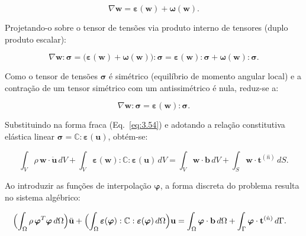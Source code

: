 \begin{equation}
    \nabla\mathbf{w} = \boldsymbol{\varepsilon}(\mathbf{w}) + \boldsymbol{\omega}(\mathbf{w}).
    \label{eq:3.55}
\end{equation}

\indent Projetando-o sobre o tensor de tensões via produto interno de tensores (duplo produto escalar): 

\begin{equation}
    \nabla\mathbf{w} : \boldsymbol{\sigma}  = \bigl( \boldsymbol{\varepsilon}(\mathbf{w}) + \boldsymbol{\omega}(\mathbf{w}) \bigr) : \boldsymbol{\sigma}  = \boldsymbol{\varepsilon}(\mathbf{w}) : \boldsymbol{\sigma}  + \boldsymbol{\omega}(\mathbf{w}) : \boldsymbol{\sigma}.
    \label{eq:3.56}
\end{equation}

\indent Como o tensor de tensões $\boldsymbol{\sigma}$ é simétrico (equilíbrio de momento angular local) e a contração de um tensor simétrico com um antissimétrico é nula, reduz-se a:

\begin{equation}
    \nabla\mathbf{w} : \boldsymbol{\sigma}  =  \boldsymbol{\varepsilon}(\mathbf{w}) : \boldsymbol{\sigma} .
    \label{eq:3.57}
\end{equation}

\indent Substituindo na forma fraca (Eq.~\ref{eq:3.54}) e adotando a relação constitutiva elástica linear \(\boldsymbol{\sigma} = \mathbb{C} : \boldsymbol{\varepsilon}(\mathbf{u})\), obtém-se:

\begin{equation}
    \int_{V} \rho \, \mathbf{w} \cdot \ddot{\mathbf{u}} \, dV + \int_{V}  \boldsymbol{\varepsilon}(\mathbf{w}) : \mathbb{C} : \boldsymbol{\varepsilon}(\mathbf{u})  \, dV  
    = \int_{V} \mathbf{w} \cdot \mathbf{b} \, dV + \int_{S} \mathbf{w} \cdot \mathbf{t}^{(\hat{n})} \, dS.
    \label{eq:3.58}
\end{equation}

\indent Ao introduzir as funções de interpolação $\boldsymbol{\varphi}$, a forma discreta do problema resulta no sistema algébrico:

\begin{equation}
\begin{aligned}
    &\Bigl( \int_{\Omega} \rho \, \boldsymbol{\varphi}^T \boldsymbol{\varphi} \, d\Omega \Bigr) \ddot{\mathbf{u}} 
    + \Bigl( \int_{\Omega}  \boldsymbol{\varepsilon}(\boldsymbol{\varphi}) : \mathbb{C} : \boldsymbol{\varepsilon}(\boldsymbol{\varphi}) \, d\Omega \Bigr) \mathbf{u}   
    = \int_{\Omega} \boldsymbol{\varphi} \cdot \mathbf{b} \, d\Omega + \int_{\Gamma} \boldsymbol{\varphi} \cdot \mathbf{t}^{(\hat{n})} \, d\Gamma.
\end{aligned}
    \label{eq:3.59}
\end{equation}

